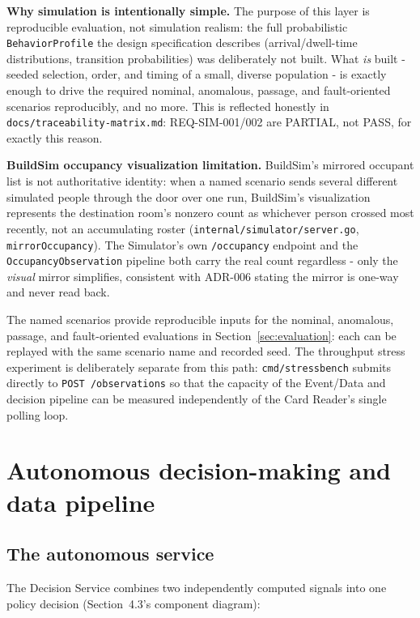 \documentclass[11pt]{article}
\begin{document}
\textbf{Why simulation is intentionally simple.} The purpose of this
layer is reproducible evaluation, not simulation realism: the full
probabilistic \texttt{BehaviorProfile} the design specification describes
(arrival/dwell-time distributions, transition probabilities) was
deliberately not built. What \emph{is} built - seeded selection, order, and timing of a small,
diverse population - is exactly enough to drive the required nominal,
anomalous, passage, and fault-oriented scenarios reproducibly, and no
more. This is reflected honestly in
\texttt{docs/traceability-matrix.md}: REQ-SIM-001/002 are PARTIAL, not
PASS, for exactly this reason.

\textbf{BuildSim occupancy visualization limitation.} BuildSim's mirrored
occupant list is not authoritative identity: when a named scenario sends
several different simulated people through the door over one run,
BuildSim's visualization represents the destination room's nonzero count
as whichever person crossed most recently, not an accumulating roster
(\texttt{internal/simulator/server.go}, \texttt{mirrorOccupancy}). The
Simulator's own \texttt{/occupancy} endpoint and the
\texttt{OccupancyObservation} pipeline both carry the real count
regardless - only the \emph{visual} mirror simplifies, consistent with
ADR-006 stating the mirror is one-way and never read back.

The named scenarios provide reproducible inputs for the nominal,
anomalous, passage, and fault-oriented evaluations in
Section~\ref{sec:evaluation}: each can be replayed with the same scenario
name and recorded seed. The throughput stress experiment is deliberately
separate from this path: \texttt{cmd/stressbench} submits directly to
\texttt{POST /observations} so that the capacity of the Event/Data and
decision pipeline can be measured independently of the Card Reader's
single polling loop.

\section{Autonomous decision-making and data pipeline}
\label{sec:autonomous}

\subsection{The autonomous service}

The Decision Service combines two independently computed signals into
one policy decision (Section~4.3's component diagram):
\end{document}
